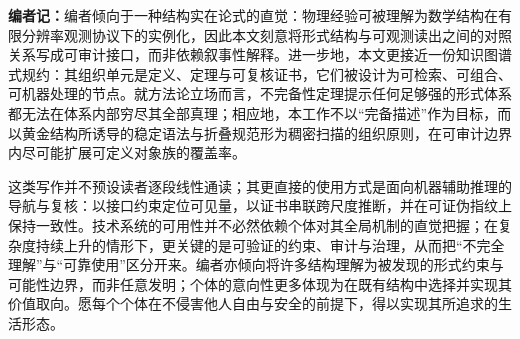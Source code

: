 \begin{sloppypar}
\textbf{编者记：}编者倾向于一种结构实在论式的直觉：物理经验可被理解为数学结构在有限分辨率观测协议下的实例化，因此本文刻意将形式结构与可观测读出之间的对照关系写成可审计接口，而非依赖叙事性解释。进一步地，本文更接近一份知识图谱式规约：其组织单元是定义、定理与可复核证书，它们被设计为可检索、可组合、可机器处理的节点。就方法论立场而言，不完备性定理提示任何足够强的形式体系都无法在体系内部穷尽其全部真理；相应地，本工作不以“完备描述”作为目标，而以黄金结构所诱导的稳定语法与折叠规范形为稠密扫描的组织原则，在可审计边界内尽可能扩展可定义对象族的覆盖率。
\par
这类写作并不预设读者逐段线性通读；其更直接的使用方式是面向机器辅助推理的导航与复核：以接口约束定位可见量，以证书串联跨尺度推断，并在可证伪指纹上保持一致性。技术系统的可用性并不必然依赖个体对其全局机制的直觉把握；在复杂度持续上升的情形下，更关键的是可验证的约束、审计与治理，从而把“不完全理解”与“可靠使用”区分开来。编者亦倾向将许多结构理解为被发现的形式约束与可能性边界，而非任意发明；个体的意向性更多体现为在既有结构中选择并实现其价值取向。愿每个个体在不侵害他人自由与安全的前提下，得以实现其所追求的生活形态。
\end{sloppypar}
